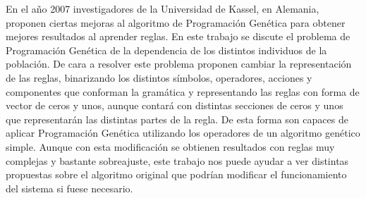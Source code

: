 En el año 2007 investigadores de la Universidad de Kassel, en Alemania, proponen \cite{mejorasPGreglas} ciertas mejoras al algoritmo de Programación Genética para obtener mejores resultados al aprender reglas. En este trabajo se discute el problema de Programación Genética de la dependencia de los distintos individuos de la población. De cara a resolver este problema proponen cambiar la representación de las reglas, binarizando los distintos símbolos, operadores, acciones y componentes que conforman la gramática y representando las reglas con forma de vector de ceros y unos, aunque contará con distintas secciones de ceros y unos que representarán las distintas partes de la regla. De esta forma son capaces de aplicar Programación Genética utilizando los operadores de un algoritmo genético simple. Aunque con esta modificación se obtienen resultados con reglas muy complejas y bastante sobreajuste, este trabajo nos puede ayudar a ver distintas propuestas sobre el algoritmo original que podrían modificar el funcionamiento del sistema si fuese necesario.


\newpage
